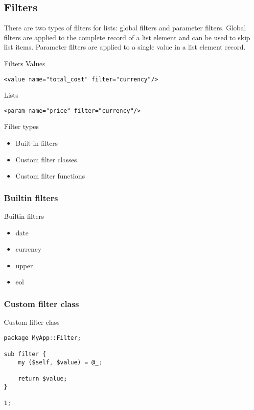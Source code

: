 \subsection{Filters}
There are two types of filters for lists: global filters and
parameter filters. Global filters are applied to the complete
record of a list element and can be used to skip list items.
Parameter filters are applied to a single value in a list
element record.

\begin{frame}[fragile]{Filters}
Values
\begin{lstlisting}
<value name="total_cost" filter="currency"/>
\end{lstlisting}
Lists
\begin{lstlisting}
<param name="price" filter="currency"/>
\end{lstlisting}

\end{frame}

\begin{frame}{Filter types}
\begin{itemize}
\item{Built-in filters}
\item{Custom filter classes}
\item{Custom filter functions}
\end{itemize}
\end{frame}

\subsubsection{Builtin filters}
\begin{frame}{Builtin filters}
\begin{itemize}
\item date
\item currency
\item upper
\item eol
\end{itemize}
\end{frame}

\subsubsection{Custom filter class}
\begin{frame}[fragile]{Custom filter class}
\begin{lstlisting}
package MyApp::Filter;

sub filter {
    my ($self, $value) = @_;

    return $value;
}

1;
\end{lstlisting}
\end{frame}

